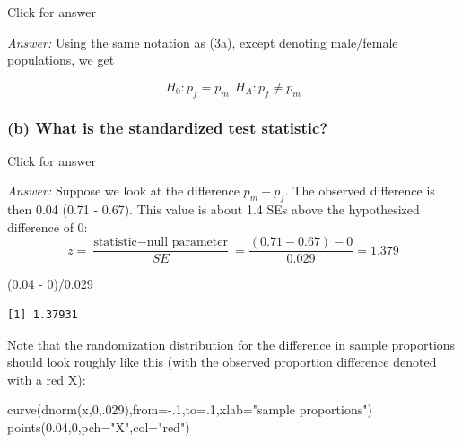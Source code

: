 \documentclass[
]{book}
\newenvironment{Shaded}{\begin{snugshade}}{\end{snugshade}}
\newcommand{\AttributeTok}[1]{\textcolor[rgb]{0.77,0.63,0.00}{#1}}
\newcommand{\DecValTok}[1]{\textcolor[rgb]{0.00,0.00,0.81}{#1}}
\newcommand{\FloatTok}[1]{\textcolor[rgb]{0.00,0.00,0.81}{#1}}
\newcommand{\FunctionTok}[1]{\textcolor[rgb]{0.00,0.00,0.00}{#1}}
\newcommand{\NormalTok}[1]{#1}
\newcommand{\SpecialCharTok}[1]{\textcolor[rgb]{0.00,0.00,0.00}{#1}}
\newcommand{\StringTok}[1]{\textcolor[rgb]{0.31,0.60,0.02}{#1}}
\begin{document}
Click for answer

\emph{Answer:} Using the same notation as (3a), except denoting male/female populations, we get

\[
H_0: p_f = p_m \ \ H_A: p_f \neq p_m
\]

\hypertarget{b-what-is-the-standardized-test-statistic-1}{%
\subsubsection{(b) What is the standardized test statistic?}\label{b-what-is-the-standardized-test-statistic-1}}

Click for answer

\emph{Answer:} Suppose we look at the difference \(p_m - p_f\). The observed difference is then 0.04 (0.71 - 0.67). This value is about 1.4 SEs above the hypothesized difference of 0:
\[
z = \dfrac{\textrm{statistic} - \textrm{null parameter}}{SE} = \dfrac{(0.71 - 0.67) - 0}{0.029} = 1.379
\]

\begin{Shaded}
\begin{Highlighting}[]
\NormalTok{(}\FloatTok{0.04} \SpecialCharTok{{-}} \DecValTok{0}\NormalTok{)}\SpecialCharTok{/}\FloatTok{0.029}
\end{Highlighting}
\end{Shaded}

\begin{verbatim}
[1] 1.37931
\end{verbatim}

Note that the randomization distribution for the difference in sample proportions should look roughly like this (with the observed proportion difference denoted with a red X):

\begin{Shaded}
\begin{Highlighting}[]
\FunctionTok{curve}\NormalTok{(}\FunctionTok{dnorm}\NormalTok{(x,}\DecValTok{0}\NormalTok{,.}\DecValTok{029}\NormalTok{),}\AttributeTok{from=}\SpecialCharTok{{-}}\NormalTok{.}\DecValTok{1}\NormalTok{,}\AttributeTok{to=}\NormalTok{.}\DecValTok{1}\NormalTok{,}\AttributeTok{xlab=}\StringTok{"sample proportions"}\NormalTok{)}
\FunctionTok{points}\NormalTok{(}\FloatTok{0.04}\NormalTok{,}\DecValTok{0}\NormalTok{,}\AttributeTok{pch=}\StringTok{"X"}\NormalTok{,}\AttributeTok{col=}\StringTok{"red"}\NormalTok{)}
\end{Highlighting}
\end{Shaded}
\end{document}
